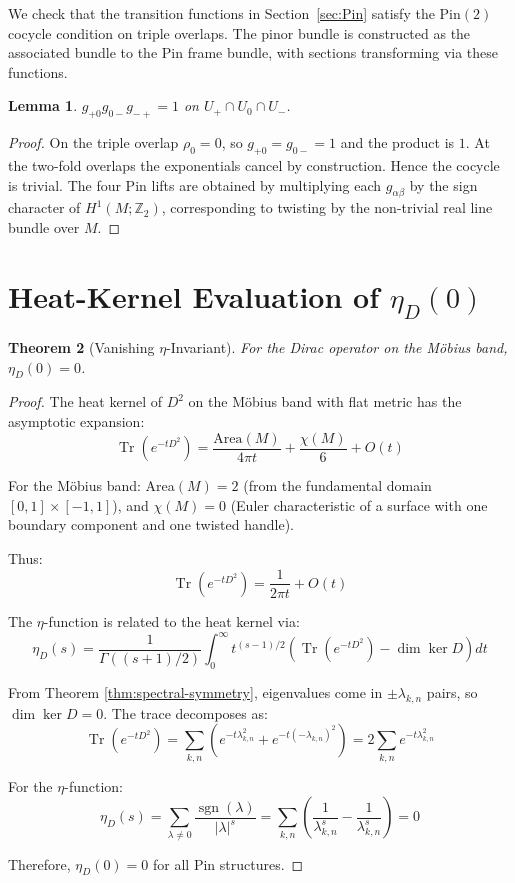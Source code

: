 \documentclass[11pt]{amsart}
\newtheorem{theorem}{Theorem}[section]
\newtheorem{lemma}[theorem]{Lemma}
\theoremstyle{definition}
\theoremstyle{remark}
\newcommand{\ZZ}{\mathbb{Z}}
\DeclareMathOperator{\sgn}{sgn}
\DeclareMathOperator{\Tr}{Tr}
\begin{document}
We check that the transition functions in Section~\ref{sec:Pin} satisfy the $\mathrm{Pin}(2)$ cocycle condition on triple overlaps. The pinor bundle is constructed as the associated bundle to the Pin frame bundle, with sections transforming via these functions.

\begin{lemma}
$g_{+0}g_{0-}g_{-+}=1$ on $U_{+}\cap U_{0}\cap U_{-}$.
\end{lemma}

\begin{proof}
On the triple overlap $\rho_0=0$, so $g_{+0}=g_{0-}=1$ and the product is $1$.  At the two-fold overlaps the exponentials cancel by construction.  Hence the cocycle is trivial. The four Pin lifts are obtained by multiplying each $g_{\alpha\beta}$ by the sign character of $H^1(M;\ZZ_2)$, corresponding to twisting by the non-trivial real line bundle over $M$.
\end{proof}

\section{Heat-Kernel Evaluation of \texorpdfstring{$\eta_D(0)$}{eta\_D(0)}}\label{app:eta}

\begin{theorem}[Vanishing $\eta$-Invariant]\label{thm:eta-vanishing}
For the Dirac operator on the Möbius band, $\eta_D(0) = 0$.
\end{theorem}

\begin{proof}
The heat kernel of $D^2$ on the Möbius band with flat metric has the asymptotic expansion:
\[
\Tr(e^{-tD^2}) = \frac{\text{Area}(M)}{4\pi t} + \frac{\chi(M)}{6} + O(t)
\]

For the Möbius band: Area$(M) = 2$ (from the fundamental domain $[0,1] \times [-1,1]$), and $\chi(M) = 0$ (Euler characteristic of a surface with one boundary component and one twisted handle).

Thus:
\[
\Tr(e^{-tD^2}) = \frac{1}{2\pi t} + O(t)
\]

The $\eta$-function is related to the heat kernel via:
\[
\eta_D(s) = \frac{1}{\Gamma((s+1)/2)} \int_0^\infty t^{(s-1)/2} \left(\Tr(e^{-tD^2}) - \dim \ker D\right) dt
\]

From Theorem \ref{thm:spectral-symmetry}, eigenvalues come in $\pm\lambda_{k,n}$ pairs, so $\dim \ker D = 0$. The trace decomposes as:
\[
\Tr(e^{-tD^2}) = \sum_{k,n} \left(e^{-t\lambda_{k,n}^2} + e^{-t(-\lambda_{k,n})^2}\right) = 2\sum_{k,n} e^{-t\lambda_{k,n}^2}
\]

For the $\eta$-function:
\[
\eta_D(s) = \sum_{\lambda \neq 0} \frac{\sgn(\lambda)}{|\lambda|^s} = \sum_{k,n} \left(\frac{1}{\lambda_{k,n}^s} - \frac{1}{\lambda_{k,n}^s}\right) = 0
\]

Therefore, $\eta_D(0) = 0$ for all Pin structures.
\end{proof}
\end{document}
